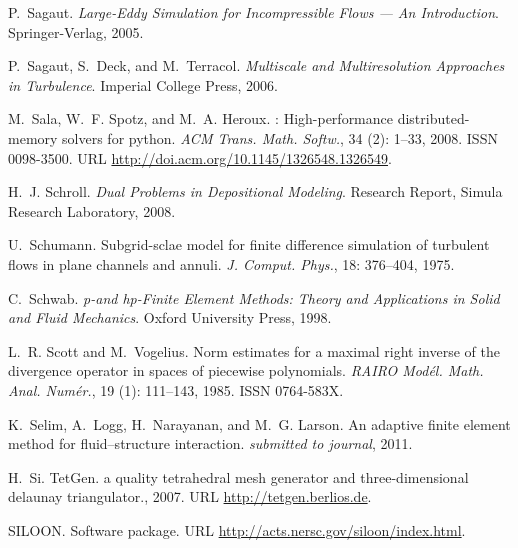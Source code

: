 \begin{thebibliography}{467}
P.~Sagaut.
\newblock \emph{Large-Eddy Simulation for Incompressible Flows --- An
  Introduction}.
\newblock Springer-Verlag, 2005.

P.~Sagaut, S.~Deck, and M.~Terracol.
\newblock \emph{Multiscale and Multiresolution Approaches in Turbulence}.
\newblock Imperial College Press, 2006.

M.~Sala, W.~F. Spotz, and M.~A. Heroux.
: {H}igh-performance distributed-memory solvers for
  python.
\newblock \emph{ACM Trans. Math. Softw.}, 34 (2): 1--33,
  2008.
\newblock ISSN 0098-3500.
\newblock URL \url{http://doi.acm.org/10.1145/1326548.1326549}.

H.~J. Schroll.
\newblock \emph{Dual Problems in Depositional Modeling}.
\newblock Research Report, Simula Research Laboratory, 2008.

U.~Schumann.
\newblock Subgrid-sclae model for finite difference simulation of turbulent
  flows in plane channels and annuli.
\newblock \emph{J. Comput. Phys.}, 18: 376--404, 1975.

C.~Schwab.
\newblock \emph{{p}-and {hp}-Finite Element Methods: Theory and Applications in
  Solid and Fluid Mechanics}.
\newblock Oxford University Press, 1998.

L.~R. Scott and M.~Vogelius.
\newblock Norm estimates for a maximal right inverse of the divergence operator
  in spaces of piecewise polynomials.
\newblock \emph{RAIRO Mod\'el. Math. Anal. Num\'er.}, 19 (1):
  111--143, 1985.
\newblock ISSN 0764-583X.

K.~Selim, A.~Logg, H.~Narayanan, and M.~G. Larson.
\newblock An adaptive finite element method for fluid--structure interaction.
\newblock \emph{submitted to journal}, 2011.

H.~Si.
\newblock Tet{G}en. a quality tetrahedral mesh generator and three-dimensional
  delaunay triangulator., 2007.
\newblock URL \url{http://tetgen.berlios.de}.

SILOON.
\newblock Software package.
\newblock URL \url{http://acts.nersc.gov/siloon/index.html}.


\end{thebibliography}
